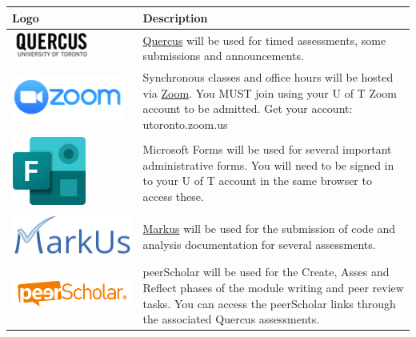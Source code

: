 \documentclass[
  openany]{book}
\begin{document}
\begin{longtable}[]{@{}
  >{\centering\arraybackslash}p{}
  >{\centering\arraybackslash}p{}@{}}
\toprule
Logo & Description \\
\midrule
\endhead
\includegraphics{images/course-tools/quercus.jpg} & \href{https://q.utoronto.ca/}{Quercus}
will be used for timed
assessments, some submissions
and announcements. \\
\includegraphics{images/course-tools/zoom.png} & Synchronous classes and office
hours will be hosted via
\href{https://utoronto.zoom.us}{Zoom}.
You MUST join using your U of
T Zoom account to be admitted.
Get your account:
utoronto.zoom.us \\
\includegraphics{images/course-tools/forms.png} & Microsoft Forms will be used
for several important
administrative forms. You will
need to be signed in to your U
of T account in the same
browser to access these. \\
\includegraphics{images/course-tools/markus_logo.jpeg} & \href{\%60r\%20markus\%60}{Markus} will be
used for the submission of
code and analysis
documentation for several
assessments. \\
\includegraphics{images/course-tools/peer-scholar.png} & peerScholar will be used for
the Create, Asses and Reflect
phases of the module writing
and peer review tasks. You can
access the peerScholar links
through the associated Quercus
assessments. \\
\bottomrule
\end{longtable}
\end{document}
